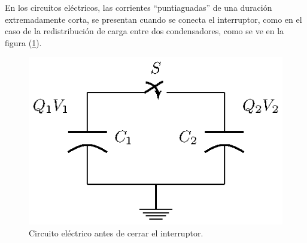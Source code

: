 En los circuitos eléctricos, las corrientes \enquote{puntiaguadas} de una duración extremadamente corta, se presentan cuando se conecta el interruptor, como en el caso de la redistribución de carga entre dos condensadores, como se ve en la figura (\ref{fig_figura_delta_Dirac_03}).
\begin{figure}[H]
    \centering
    \includegraphics[scale=1.4]{Imagenes/delta_Dirac_03.eps}
    \caption{Circuito eléctrico antes de cerrar el interruptor.}
    \label{fig_figura_delta_Dirac_03}
\end{figure}
